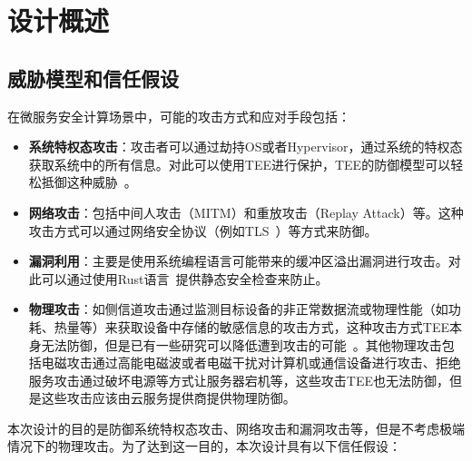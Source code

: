 \section{设计概述}\label{sec:overview}

\subsection{威胁模型和信任假设}\label{subsec:threat-model}

在微服务安全计算场景中，可能的攻击方式和应对手段包括：

\begin{itemize}
    \item \textbf{系统特权态攻击}：攻击者可以通过劫持OS或者Hypervisor，通过系统的特权态获取系统中的所有信息。对此可以使用TEE进行保护，TEE的防御模型可以轻松抵御这种威胁~\cite{costan2016intel}。
    \item \textbf{网络攻击}：包括中间人攻击（MITM）和重放攻击（Replay Attack）等。这种攻击方式可以通过网络安全协议（例如TLS~\cite{8446}）等方式来防御。
    \item \textbf{漏洞利用}：主要是使用系统编程语言可能带来的缓冲区溢出漏洞进行攻击。对此可以通过使用Rust语言~\cite{rust-lang}提供静态安全检查来防止。
    \item \textbf{物理攻击}：如侧信道攻击通过监测目标设备的非正常数据流或物理性能（如功耗、热量等）来获取设备中存储的敏感信息的攻击方式，这种攻击方式TEE本身无法防御，但是已有一些研究可以降低遭到攻击的可能~\cite{oleksenko2018varys}。其他物理攻击包括电磁攻击通过高能电磁波或者电磁干扰对计算机或通信设备进行攻击、拒绝服务攻击通过破坏电源等方式让服务器宕机等，这些攻击TEE也无法防御，但是这些攻击应该由云服务提供商提供物理防御。
\end{itemize}

本次设计的目的是防御系统特权态攻击、网络攻击和漏洞攻击等，但是不考虑极端情况下的物理攻击。为了达到这一目的，本次设计具有以下信任假设：

